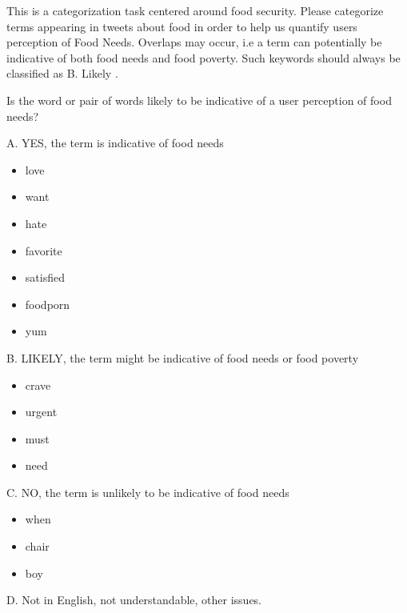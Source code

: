This is a categorization task centered around food security. Please categorize terms appearing in tweets about food in order to help us quantify users perception of Food Needs. Overlaps may occur, i.e a term can potentially be indicative of both food needs and food poverty. Such keywords should always be classified as B. Likely .

Is the word or pair of words likely to be indicative of a user perception of food needs?

A. YES, the term is indicative of food needs

\begin{itemize}
  \item love
  \item want
  \item hate
  \item favorite 
  \item satisfied
  \item foodporn
  \item yum


\end{itemize}

B. LIKELY, the term might be indicative of food needs or food poverty
\begin{itemize}
  \item crave
  \item urgent
  \item must
  \item need
\end{itemize}

C. NO, the term is unlikely to be indicative of food needs 
\begin{itemize}
  \item when
  \item chair
  \item boy
\end{itemize}

D. Not in English, not understandable, other issues.

